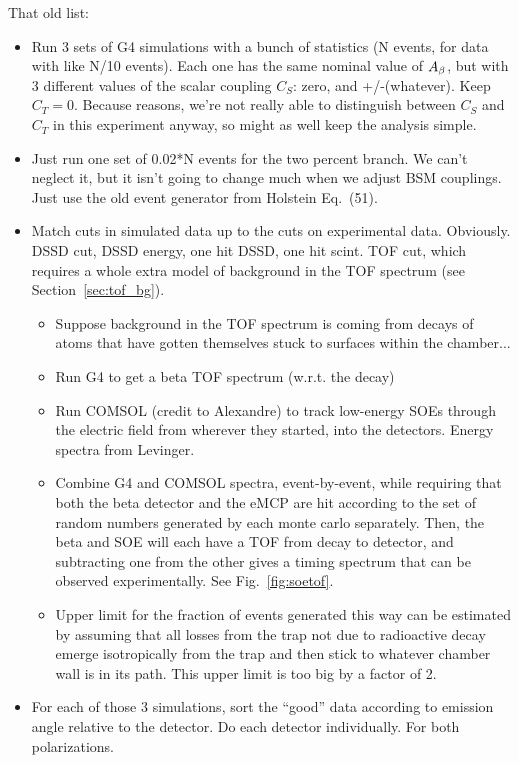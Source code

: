 That old list:
\begin{itemize}
	\item Run 3 sets of G4 simulations with a bunch of statistics (N events, for data with like N/10 events).  Each one has the same nominal value of $A_{\beta}$, but with 3 different values of the scalar coupling $C_S$:  zero, and +/-(whatever).  Keep $C_T=0$.  Because reasons, we're not really able to distinguish between $C_S$ and $C_T$ in this experiment anyway, so might as well keep the analysis simple.
	\item Just run one set of 0.02*N events for the two percent branch.  We can't neglect it, but it isn't going to change much when we adjust BSM couplings.  Just use the old event generator from Holstein Eq.~(51).
	\item Match cuts in simulated data up to the cuts on experimental data.  Obviously.  DSSD cut, DSSD energy, one hit DSSD, one hit scint.  TOF cut, which requires a whole extra model of background in the TOF spectrum (see Section~\ref{sec:tof_bg}).
	\begin{itemize}
		\item Suppose background in the TOF spectrum is coming from decays of atoms that have gotten themselves stuck to surfaces within the chamber...
		\item Run G4 to get a beta TOF spectrum (w.r.t. the decay)
		\item Run COMSOL (credit to Alexandre) to track low-energy SOEs through the electric field from wherever they started, into the detectors.  Energy spectra from Levinger.
		\item Combine G4 and COMSOL spectra, event-by-event, while requiring that both the beta detector and the eMCP are hit according to the set of random numbers generated by each monte carlo separately.  Then, the beta and SOE will each have a TOF from decay to detector, and subtracting one from the other gives a timing spectrum that can be observed experimentally.  See Fig.~\ref{fig:soetof}.
		\item Upper limit for the fraction of events generated this way can be estimated by assuming that all losses from the trap not due to radioactive decay emerge isotropically from the trap and then stick to whatever chamber wall is in its path.  This upper limit is too big by a factor of 2.
	\end{itemize}
	\item For each of those 3 simulations, sort the ``good'' data according to emission angle relative to the detector.  Do each detector individually.  For both polarizations.

\end{itemize}

